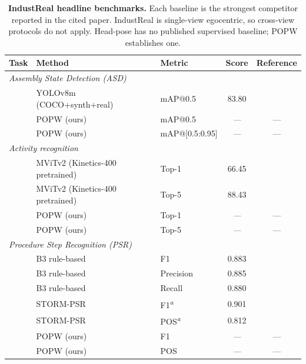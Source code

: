 \documentclass[11pt,a4paper]{article}
\newcommand{\popw}{POPW}
\newcommand{\industreal}{IndustReal}
\newcommand{\map}{mAP}
\newcommand{\todo}{\textit{---}}              %
\newcommand{\popwres}{\todo}                  %
\newcommand{\sym}[1]{\textsuperscript{\textit{#1}}}
\begin{document}
\begin{table}[!htbp]
\centering
\small
\caption{\textbf{\industreal{} headline benchmarks.} Each baseline is the strongest competitor
reported in the cited paper. \industreal{} is single-view egocentric, so cross-view protocols
do not apply. Head-pose has no published supervised baseline; \popw{} establishes one.}
\label{tab:industreal-headline}
\renewcommand{\arraystretch}{1.15}
\begin{tabular}{l l l c c}
\toprule
\textbf{Task} & \textbf{Method} & \textbf{Metric} & \textbf{Score} & \textbf{Reference} \\
\midrule
\multicolumn{5}{l}{\textit{Assembly State Detection (ASD)}} \\
& YOLOv8m (COCO+synth+real) & \map{}@0.5     & 83.80 & \cite{schoonbeek2024industreal} \\
& \popw{} (ours)            & \map{}@0.5     & \popwres & --- \\
& \popw{} (ours)            & \map{}@[0.5{:}0.95] & \popwres & --- \\
\midrule
\multicolumn{5}{l}{\textit{Activity recognition}} \\
& MViTv2 (Kinetics-400 pretrained) & Top-1   & 66.45 & \cite{schoonbeek2024industreal} \\
& MViTv2 (Kinetics-400 pretrained) & Top-5   & 88.43 & \cite{schoonbeek2024industreal} \\
& \popw{} (ours)            & Top-1          & \popwres & --- \\
& \popw{} (ours)            & Top-5          & \popwres & --- \\
\midrule
\multicolumn{5}{l}{\textit{Procedure Step Recognition (PSR)}} \\
& B3 rule-based             & F1             & 0.883 & \cite{schoonbeek2024industreal} \\
& B3 rule-based             & Precision      & 0.885 & \cite{schoonbeek2024industreal} \\
& B3 rule-based             & Recall         & 0.880 & \cite{schoonbeek2024industreal} \\
& STORM-PSR                 & F1\sym{a}      & 0.901 & \cite{schoonbeek2025storm} \\
& STORM-PSR                 & POS\sym{a}     & 0.812 & \cite{schoonbeek2025storm} \\
& \popw{} (ours)            & F1             & \popwres & --- \\
& \popw{} (ours)            & POS            & \popwres & --- \\

\end{tabular}
\end{table}
\end{document}
